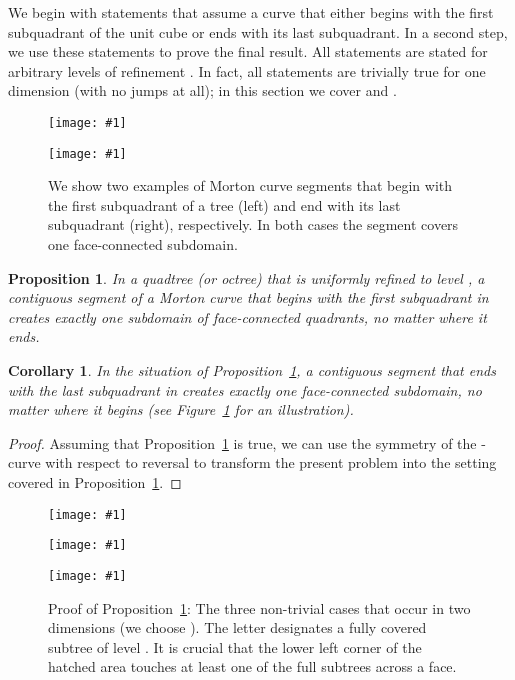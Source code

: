 \documentclass[a4paper,11pt]{article}
\newcommand{\inputtikz}[1]{\texttt{[image: \#1]}}
\newcommand{\figlab}[1]{\label{fig:#1}}
\newcommand{\figref}[1]{Figure~\ref{fig:#1}}
\newtheorem{prop}[thm]{Proposition}
\newtheorem{cor}[thm]{Corollary}
\begin{document}
We begin with statements that assume a curve that either begins with the first
subquadrant of the unit cube or ends with its last subquadrant.  In a second
step, we use these statements to prove the final result.  All statements are
stated for arbitrary levels of refinement .  In fact, all statements
are trivially true for one dimension  (with no jumps at all); in this
section we cover  and .
\begin{figure}\centering
\begin{minipage}{0.49\textwidth}\centering
    \inputtikz{onepiece1}
  \end{minipage}
  \begin{minipage}{0.49\textwidth}\centering
    \inputtikz{onepiece2}
  \end{minipage}
  \caption{We show two  examples of Morton curve segments that begin
           with the first subquadrant of a tree (left) and end with its last
           subquadrant (right), respectively.  In both cases the segment covers
           one face-connected subdomain.}
  \figlab{onepiece}
\end{figure}
\begin{prop}
  \label{illpropfirst}
  In a quadtree (or octree)  that is uniformly refined to level , a
  contiguous segment of a Morton curve that begins with the first subquadrant
  in  creates exactly one subdomain of face-connected quadrants, no matter
  where it ends.
\end{prop}
\begin{cor}
  \label{illcorlast}
  In the situation of Proposition~\ref{illpropfirst}, a contiguous segment that ends
  with the last subquadrant in  creates exactly one face-connected
  subdomain, no matter where it begins (see \figref{onepiece} for an
  illustration).
\end{cor}
\begin{proof}
  Assuming that Proposition~\ref{illpropfirst} is true, we can use the symmetry of
  the -curve with respect to reversal to transform the present
  problem into the setting covered in Proposition~\ref{illpropfirst}.
\end{proof}
\begin{figure}\centering
\begin{minipage}{0.32\textwidth}\centering
    \inputtikz{twodproof1}
  \end{minipage}
  \begin{minipage}{0.32\textwidth}\centering
    \inputtikz{twodproof2}
  \end{minipage}
  \begin{minipage}{0.32\textwidth}\centering
    \inputtikz{twodproof3}
  \end{minipage}
  \caption{Proof of Proposition~\ref{illpropfirst}:  The three non-trivial cases
    that occur in two dimensions (we choose ).  The letter 
    designates a fully covered subtree of level .  It is crucial that
    the lower left corner of the hatched area touches at least one of the full
    subtrees across a face.}
  \figlab{twodproof}
\end{figure}
\end{document}
